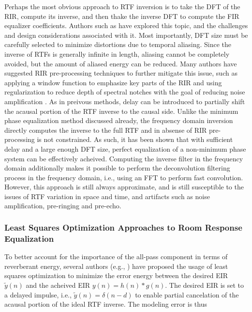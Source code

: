 Perhaps the most obvious approach to RTF inversion is to take the DFT of the RIR, compute its inverse, and then thake the inverse DFT to compute the FIR equalizer coefficients. Authors such as \cite{kulp1988digital} have explored this topic, and the challenges and design considerations associated with it. Most importantly, DFT size must be carefully selected to minimize distortions due to temporal aliasing. Since the inverse of RTFs is generally infinite in length, aliasing cannot be completely avoided, but the amount of aliased energy can be reduced. Many authors have suggested RIR pre-processing techniques to further mitigate this issue, such as applying a window function to emphasize key parts of the RIR \citep{kulp1988digital} and using regularization to reduce depth of spectral notches with the goal of reducing noise amplification \citep{bean1989loudspeaker, kirkeby1996fast}. As in preivous methods, delay can be introduced to partially shift the acausal portion of the RTF inverse to the causal side. Unlike the minimum phase equalization method discussed already, the frequency domain inversion directly computes the inverse to the full RTF and in absense of RIR pre-processing is not constrained. As such, it has been shown that with sufficient delay and a large enough DFT size, perfect equalization of a non-minimum phase system can be effectively acheived. Computing the inverse filter in the frequency domain additionally makes it possible to perform the deconvolution filtering process in the frequency domain, i.e., using an FFT to perform fast convolution. However, this approach is still always approximate, and is still susceptible to the issues of RTF variation in space and time, and artifacts such as noise amplification, pre-ringing and pre-echo.

\subsubsection{Least Squares Optimization Approaches to Room Response Equalization}

To better account for the importance of the all-pass component in terms of reverberant energy, several authors (e.g., \cite{clarkson1985spectral}) have proposed the usage of least squares optimization to minimize the error energy between the desired EIR $\tilde{y}(n)$ and the acheived EIR $y(n)=h(n)*g(n)$.  The desired EIR is set to a delayed impulse, i.e., $\tilde{y}(n)=\delta(n-d)$ to enable partial cancelation of the acausal portion of the ideal RTF inverse. The modeling error is thus


